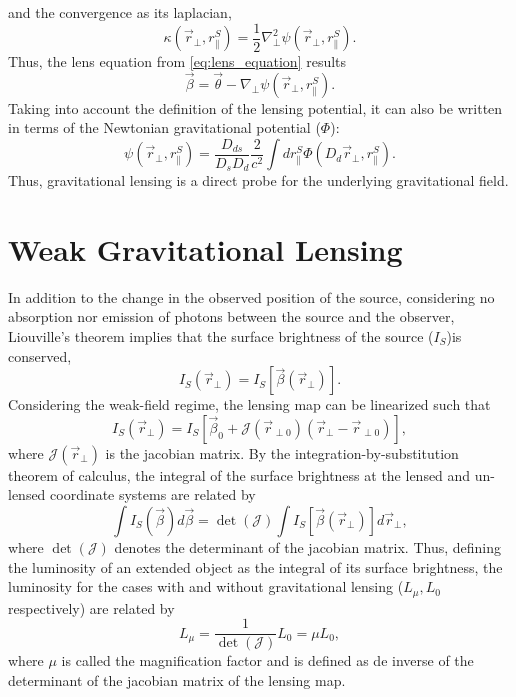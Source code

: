 and the convergence as its laplacian,
\begin{equation}
\kappa(\vec r_\perp,r_\parallel^S)=\frac{1}{2}\nabla^2_\perp\psi(\vec r_\perp,r_\parallel^S).
\end{equation}
Thus, the lens equation from \autoref{eq:lens_equation} results
\begin{equation}
\vec\beta = \vec\theta-\nabla_\perp\psi(\vec r_\perp,r_\parallel^S).
\label{eq:lens_equation_2d}
\end{equation}
Taking into account the definition of the lensing potential, it can also be written in terms of the Newtonian gravitational potential ($\Phi$):
\begin{equation}
\psi(\vec r_\perp,r_\parallel^S) = \frac{D_{ds}}{D_sD_d}\frac{2}{c^2}\int dr_\parallel^S\Phi(D_d\vec r_\perp,r_\parallel^S).
\end{equation}
Thus, gravitational lensing is a direct probe for the underlying gravitational field.

\section{Weak Gravitational Lensing}

In addition to the change in the observed position of the source, considering no absorption nor emission of photons between the source and the observer, Liouville's theorem implies that the surface brightness of the source ($I_S$)is conserved,
\begin{equation}
I_S(\vec r_\perp) = I_S[\vec\beta(\vec r_\perp)].
\end{equation}
Considering the weak-field regime, the lensing map can be linearized such that
\begin{equation}
I_S(\vec r_\perp)=I_S[\vec\beta_0+\mathcal{J}(\vec r_{\perp 0})(\vec r_\perp-\vec r_{\perp0})],
\end{equation}
where $\mathcal{J}(\vec r_\perp)$ is the jacobian matrix. By the integration-by-substitution theorem of calculus, the integral of the surface brightness at the lensed and un-lensed coordinate systems are related by
\begin{equation}
\int I_S(\vec\beta)d\vec\beta = \det(\mathcal{J})\int I_S[\vec\beta(\vec r_\perp)]d\vec r_\perp,
\end{equation}
where $\det(\mathcal{J})$ denotes the determinant of the jacobian matrix. Thus, defining the luminosity of an extended object as the integral of its surface brightness, the luminosity for the cases with and without gravitational lensing ($L_\mu,L_0$ respectively) are related by
\begin{equation}
L_\mu = \frac{1}{\det(\mathcal{J})}L_0 = \mu L_0,
\end{equation}
where $\mu$ is called the magnification factor and is defined as de inverse of the determinant of the jacobian matrix of the lensing map.
\newline

